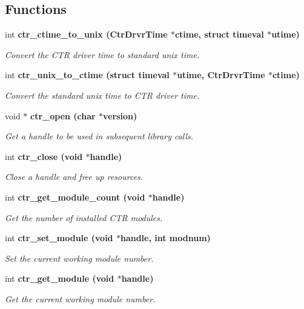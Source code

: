 \subsection*{Functions}
\begin{CompactItemize}
\item 
int \bf{ctr\_\-ctime\_\-to\_\-unix} (Ctr\-Drvr\-Time $\ast$ctime, struct timeval $\ast$utime)
\begin{CompactList}\small\item\em Convert the CTR driver time to standard unix time. \item\end{CompactList}\item 
int \bf{ctr\_\-unix\_\-to\_\-ctime} (struct timeval $\ast$utime, Ctr\-Drvr\-Time $\ast$ctime)
\begin{CompactList}\small\item\em Convert the standard unix time to CTR driver time. \item\end{CompactList}\item 
void $\ast$ \bf{ctr\_\-open} (char $\ast$version)
\begin{CompactList}\small\item\em Get a handle to be used in subsequent library calls. \item\end{CompactList}\item 
int \bf{ctr\_\-close} (void $\ast$handle)
\begin{CompactList}\small\item\em Close a handle and free up resources. \item\end{CompactList}\item 
int \bf{ctr\_\-get\_\-module\_\-count} (void $\ast$handle)
\begin{CompactList}\small\item\em Get the number of installed CTR modules. \item\end{CompactList}\item 
int \bf{ctr\_\-set\_\-module} (void $\ast$handle, int modnum)
\begin{CompactList}\small\item\em Set the current working module number. \item\end{CompactList}\item 
int \bf{ctr\_\-get\_\-module} (void $\ast$handle)
\begin{CompactList}\small\item\em Get the current working module number. \item\end{CompactList}\item 

\end{CompactItemize}
